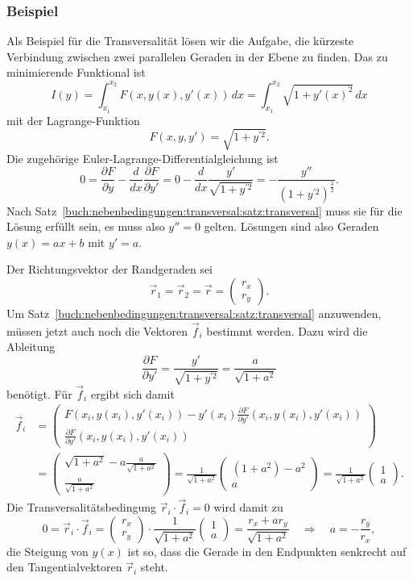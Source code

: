 %
%
\subsubsection{Beispiel}
Als Beispiel für die Transversalität lösen wir die Aufgabe, die kürzeste
Verbindung zwischen zwei parallelen Geraden in der Ebene zu finden.
Das zu minimierende Funktional ist 
\[
I(y)
=
\int_{x_1}^{x_2} F(x,y(x),y'(x))\,dx
=
\int_{x_1}^{x_2} \sqrt{1+y'(x)^2}\,dx
\]
mit der Lagrange-Funktion
\[
F(x,y,y')
=
\sqrt{1+y^{\prime 2}}.
\]
Die zugehörige Euler-Lagrange-Differentialgleichung ist 
\[
0
=
\frac{\partial F}{\partial y} - \frac{d}{dx}\frac{\partial F}{\partial y'}
=
0
-
\frac{d}{dx}
\frac{y'}{\sqrt{1+y^{\prime 2}}}
=
-
\frac{y''}{(1+y^{\prime 2})^{\frac32}}.
\]
Nach Satz~\ref{buch:nebenbedingungen:transversal:satz:transversal}
muss sie für die Lösung erfüllt sein, es muss also $y''=0$ gelten.
Lösungen sind also Geraden $y(x)=ax+b$ mit $y'=a$.

Der Richtungsvektor der Randgeraden sei
\[
\vec{r}_1
=
\vec{r}_2
=
\vec{r}
=
\begin{pmatrix}r_x\\r_y\end{pmatrix}.
\]
Um Satz~\ref{buch:nebenbedingungen:transversal:satz:transversal}
anzuwenden, müssen jetzt auch noch die Vektoren $\vec{f}_i$ bestimmt
werden.
Dazu wird die Ableitung
\[
\frac{\partial F}{\partial y'}
=
\frac{y'}{\sqrt{1+y^{\prime 2}}}
=
\frac{a}{\sqrt{1+a^2}}
\]
benötigt.
Für $\vec{f}_i$ ergibt sich damit
\begin{align*}
\vec{f}_i
&=
\begin{pmatrix}
\displaystyle
F(x_i,y(x_i),y'(x_i))
-
y'(x_i)
\frac{\partial F}{\partial y'}(x_i,y(x_i),y'(x_i))
\\[3pt]
\displaystyle
\frac{\partial F}{\partial y'}(x_i,y(x_i),y'(x_i))
\end{pmatrix}
\\
&=
\begin{pmatrix}
\displaystyle
\sqrt{1+a^2} -a\frac{a}{\sqrt{1+a^2}}
\\[3pt]
\displaystyle
\frac{a}{\sqrt{1+a^2}}
\end{pmatrix}
=
\frac{1}{\sqrt{1+a^2}}
\begin{pmatrix}
(1+a^2) -a^2\\
a
\end{pmatrix}
=
\frac{1}{\sqrt{1+a^2}}
\begin{pmatrix}
1\\
a
\end{pmatrix}.
\end{align*}
Die Transversalitätsbedingung $\vec{r}_i\cdot\vec{f}_i=0$ wird damit zu
\[
0
=
\vec{r}_i\cdot\vec{f}_i
=
\begin{pmatrix}
r_x\\r_y
\end{pmatrix}
\cdot
\frac{1}{\sqrt{1+a^2}}
\begin{pmatrix}
1\\
a
\end{pmatrix}
=
\frac{r_x+ar_y}{\sqrt{1+a^2}}
\quad\Rightarrow\quad
a
=
-\frac{r_y}{r_x},
\]
die Steigung von $y(x)$ ist so, dass die Gerade in den Endpunkten senkrecht
auf den Tangentialvektoren $\vec{r}_i$ steht.

